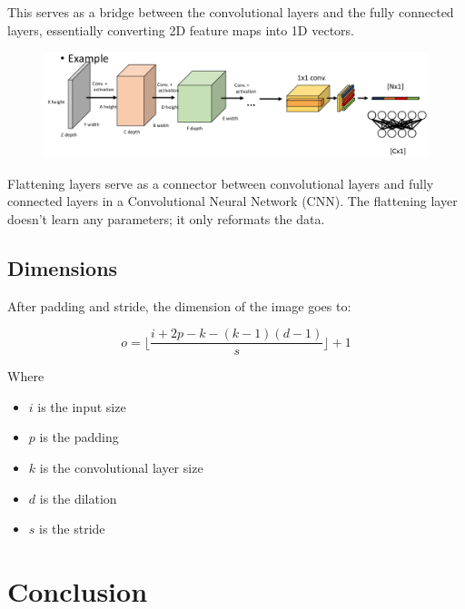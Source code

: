 \documentclass[11pt]{article}
\begin{document}
This serves as a bridge between the convolutional layers and the fully connected layers, essentially converting 2D feature maps into 1D vectors.

\begin{figure}[H]
    \centering
    \includegraphics[width=\linewidth]{figures/flattening.png}
\end{figure}

Flattening layers serve as a connector between convolutional layers and fully connected layers in a Convolutional Neural Network (CNN). The flattening layer doesn't learn any parameters; it only reformats the data.

\subsection{Dimensions}

After padding and stride, the dimension of the image goes to:

\begin{equation}
    o= \lfloor \frac{i + 2p - k - (k-1)(d-1)}s \rfloor + 1
\end{equation}

Where

\begin{itemize}
    \item $i$ is the input size
    \item $p$ is the padding
    \item $k$ is the convolutional layer size
    \item $d$ is the dilation
    \item $s$ is the stride
\end{itemize}



\section{Conclusion}
\end{document}

